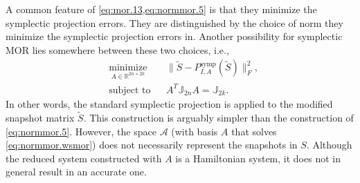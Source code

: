 \begin{rem}
A common feature of \cref{eq:mor.13,eq:normmor.5} is that they minimize the symplectic projection errors. They are distinguished by the choice of norm they minimize the symplectic projection errors in. Another possibility for symplectic MOR lies somewhere between these two choices, i.e.,
\begin{equation} \label{eq:normmor.wsmor}
\begin{aligned}
& \underset{ A\in \mathbb{R}^{2n\times 2k}}{\text{minimize}}
& & \| \tilde S - P^\text{symp}_{I, A}(\tilde S) \|_F^2, \\
& \text{subject to}
& & A^T \mathbb J_{2n} A = \mathbb J_{2k}.
\end{aligned}
\end{equation}
In other words, the standard symplectic projection is applied to the modified snapshot matrix $\tilde S$. This construction is arguably simpler than the construction of \cref{eq:normmor.5}. However, the space $\mathcal A$ (with basis $A$ that solves \eqref{eq:normmor.wsmor}) does not necessarily represent the snapshots in $S$. Although the reduced system constructed with $A$ is a Hamiltonian system, it does not in general result in an accurate one. 
\end{rem}

